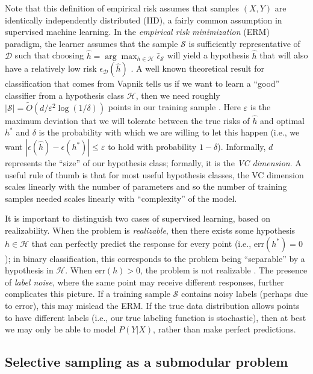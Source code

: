 \noindent Note that this definition of empirical risk assumes that samples $(X, Y)$ are identically independently distributed (IID), a fairly common assumption in supervised machine learning. In the \textit{empirical risk minimization} (ERM) paradigm, the learner assumes that the sample $\mathcal{S}$ is sufficiently representative of $\mathcal{D}$ such that choosing $\hat{h} = \arg\max_{h \in \mathcal{H}} \hat{\epsilon}_{\mathcal{S}}$ will yield a hypothesis $\hat{h}$ that will also have a relatively low risk $\epsilon_{\mathcal{D}}(\hat{h})$ \cite{Vapnik:2000}. A well known theoretical result for classification that comes from Vapnik tells us if we want to learn a ``good'' classifier from a hypothesis class $\mathcal{H}$, then we need roughly $|\mathcal{S}| = \widetilde{O}\left(d/\varepsilon^2 \log (1/\delta)\right)$ points in our training sample \cite{Vapnik:1999}. Here $\varepsilon$ is the maximum deviation that we will tolerate between the true risks of $\hat{h}$ and optimal $h^\ast$ and $\delta$ is the probability with which we are willing to let this happen (i.e., we want $|\epsilon(\hat{h}) - \epsilon(h^\ast)| \leq \varepsilon$ to hold with probability $1-\delta$). Informally, $d$ represents the ``size'' of our hypothesis class; formally, it is the \textit{VC dimension}. A useful rule of thumb is that for most useful hypothesis classes, the VC dimension scales linearly with the number of parameters and so the number of training samples needed scales linearly with ``complexity'' of the model.

It is important to distinguish two cases of supervised learning, based on realizability. When the problem is \textit{realizable}, then there exists some hypothesis $h \in \mathcal{H}$ that can perfectly predict the response for every point (i.e., $\mathrm{err}(h^\ast) = 0$); in binary classification, this corresponds to the problem being ``separable'' by a hypothesis in $\mathcal{H}$. When $\mathrm{err}(h) > 0$, the problem is not realizable \cite{Dasgupta:2011}. The presence of \textit{label noise}, where the same point may receive different responses, further complicates this picture. If a training sample $\mathcal{S}$ contains noisy labels (perhaps due to error), this may mislead the ERM. If the true data distribution allows points to have different labels (i.e., our true labeling function is stochastic), then at best we may only be able to model $P(Y|X)$, rather than make perfect predictions.

\subsection{Selective sampling as a submodular problem}

